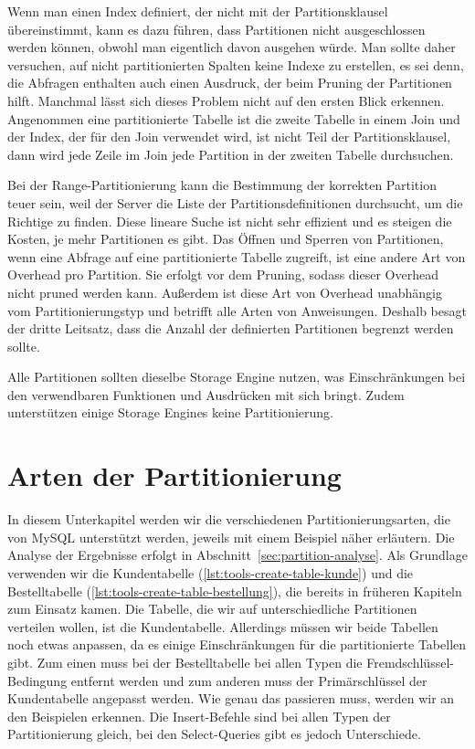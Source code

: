 Wenn man einen Index definiert, der nicht mit der Partitionsklausel übereinstimmt, kann es dazu führen, dass Partitionen nicht ausgeschlossen werden können, obwohl man eigentlich davon ausgehen würde.
Man sollte daher versuchen, auf nicht partitionierten Spalten keine Indexe zu erstellen, es sei denn, die Abfragen enthalten auch einen Ausdruck, der beim Pruning der Partitionen hilft.
Manchmal lässt sich dieses Problem nicht auf den ersten Blick erkennen.
Angenommen eine partitionierte Tabelle ist die zweite Tabelle in einem Join und der Index, der für den Join verwendet wird, ist nicht Teil der Partitionsklausel, dann wird jede Zeile im Join jede Partition in der zweiten Tabelle durchsuchen.

Bei der Range-Partitionierung kann die Bestimmung der korrekten Partition teuer sein, weil der Server die Liste der Partitionsdefinitionen durchsucht, um die Richtige zu finden.
Diese lineare Suche ist nicht sehr effizient und es steigen die Kosten, je mehr Partitionen es gibt.
Das Öffnen und Sperren von Partitionen, wenn eine Abfrage auf eine partitionierte Tabelle zugreift, ist eine andere Art von Overhead pro Partition.
Sie erfolgt vor dem Pruning, sodass dieser Overhead nicht pruned werden kann.
Außerdem ist diese Art von Overhead unabhängig vom Partitionierungstyp und betrifft alle Arten von Anweisungen.
Deshalb besagt der dritte Leitsatz, dass die Anzahl der definierten Partitionen begrenzt werden sollte.

Alle Partitionen sollten dieselbe Storage Engine nutzen, was Einschränkungen bei den verwendbaren Funktionen und Ausdrücken mit sich bringt.
Zudem unterstützen einige Storage Engines keine Partitionierung.

\section{Arten der Partitionierung}\label{sec:arten-der-partitionierung}

In diesem Unterkapitel werden wir die verschiedenen Partitionierungsarten, die von MySQL unterstützt werden, jeweils mit einem Beispiel näher erläutern.
Die Analyse der Ergebnisse erfolgt in Abschnitt~\ref{sec:partition-analyse}.
Als Grundlage verwenden wir die Kundentabelle (\ref{lst:tools-create-table-kunde}) und die Bestelltabelle (\ref{lst:tools-create-table-bestellung}), die bereits in früheren Kapiteln zum Einsatz kamen.
Die Tabelle, die wir auf unterschiedliche Partitionen verteilen wollen, ist die Kundentabelle.
Allerdings müssen wir beide Tabellen noch etwas anpassen, da es einige Einschränkungen für die partitionierte Tabellen gibt.
Zum einen muss bei der Bestelltabelle bei allen Typen die Fremdschlüssel-Bedingung entfernt werden und zum anderen muss der Primärschlüssel der Kundentabelle angepasst werden.
Wie genau das passieren muss, werden wir an den Beispielen erkennen.
Die Insert-Befehle sind bei allen Typen der Partitionierung gleich, bei den Select-Queries gibt es jedoch Unterschiede.

